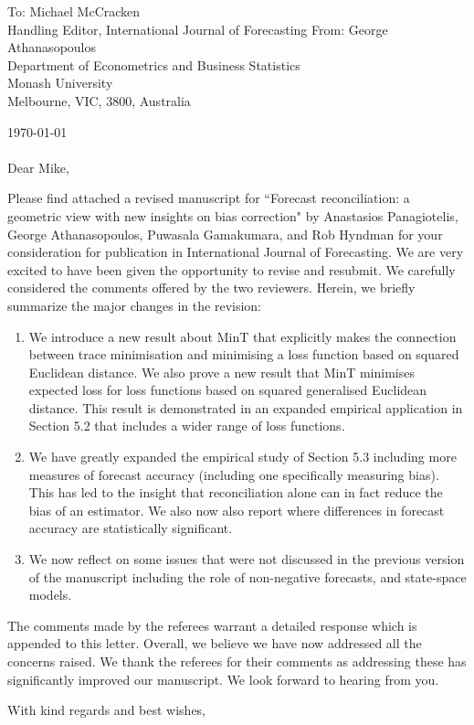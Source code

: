 \documentclass[11pt,a4paper]{letter}
\date{}
\begin{document}
 \begin{letter}{To: Michael McCracken\\
 	Handling Editor, International Journal of Forecasting
    }
    From: George Athanasopoulos\\
    Department of Econometrics and Business Statistics\\
    Monash University\\
    Melbourne, VIC, 3800, Australia

 \opening{\today\ \\\\Dear Mike,}
 \medskip

Please find attached a revised manuscript for ``Forecast reconciliation: a geometric view with new insights on bias correction" by Anastasios Panagiotelis, George Athanasopoulos, Puwasala Gamakumara, and Rob Hyndman for your consideration for publication in International Journal of Forecasting. We are very excited to have been given the opportunity to revise and resubmit. We carefully considered the comments offered by the two reviewers. Herein, we briefly summarize the major changes in the revision:
\begin{enumerate}
	\item We introduce a new result about MinT that explicitly makes the connection between trace minimisation and minimising a loss function based on squared Euclidean distance. We also prove a new result that MinT minimises expected loss for loss functions based on squared generalised Euclidean distance.  This result is demonstrated in an expanded empirical application in Section 5.2 that includes a wider range of loss functions.
	\item We have greatly expanded the empirical study of Section 5.3 including more measures of forecast accuracy (including one specifically measuring bias). This has led to the insight that reconciliation alone can in fact reduce the bias of an estimator. We also now also report where differences in forecast accuracy are statistically significant.
	\item We now reflect on some issues that were not discussed in the previous version of the manuscript including the role of non-negative forecasts, and state-space models.
\end{enumerate}

The comments made by the referees warrant a detailed response which is appended to this letter. Overall, we believe we have now addressed all the concerns raised. We thank the referees for their comments as addressing these has significantly improved our manuscript. We look forward to hearing from you.

 \closing{With kind regards and best wishes,}

 \end{letter}
\end{document}
